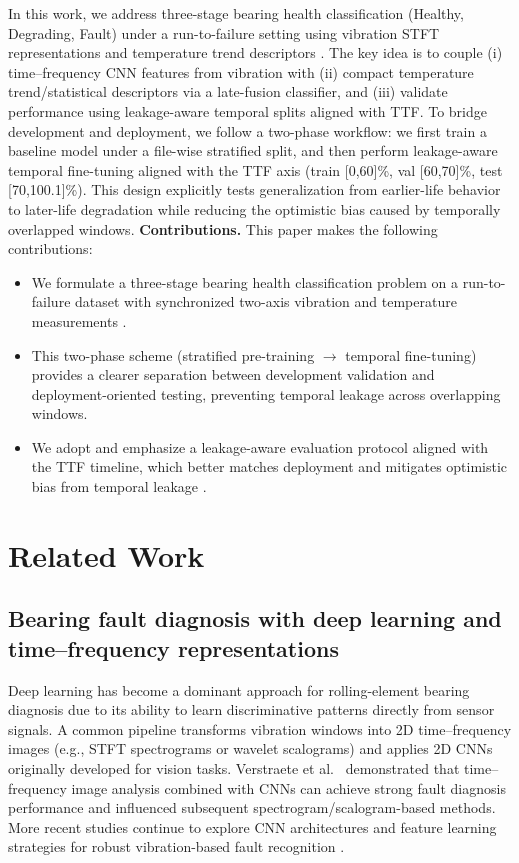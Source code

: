 \documentclass{article}
\begin{document}
In this work, we address three-stage bearing health classification (Healthy, Degrading, Fault) under a run-to-failure setting using vibration STFT representations and temperature trend descriptors \cite{jung2024dib_rtf,jung2024mendeley_rtf}. The key idea is to couple (i) time--frequency CNN features from vibration with (ii) compact temperature trend/statistical descriptors via a late-fusion classifier, and (iii) validate performance using leakage-aware temporal splits aligned with TTF.
To bridge development and deployment, we follow a two-phase workflow: we first train a baseline model under a file-wise stratified split, and then perform leakage-aware temporal fine-tuning aligned with the TTF axis (train [0,60]\%, val [60,70]\%, test [70,100.1]\%). This design explicitly tests generalization from earlier-life behavior to later-life degradation while reducing the optimistic bias caused by temporally overlapped windows.
\textbf{Contributions.} This paper makes the following contributions:
\begin{itemize}
    \item We formulate a three-stage bearing health classification problem on a run-to-failure dataset with synchronized two-axis vibration and temperature measurements \cite{jung2024dib_rtf,jung2024mendeley_rtf}.
    \item This two-phase scheme (stratified pre-training $\rightarrow$ temporal fine-tuning) provides a clearer separation between development validation and deployment-oriented testing, preventing temporal leakage across overlapping windows.
    \item We adopt and emphasize a leakage-aware evaluation protocol aligned with the TTF timeline, which better matches deployment and mitigates optimistic bias from temporal leakage \cite{wheat2024leakage,vieira2024realistic}.
\end{itemize}

\section{Related Work}
\label{sec:related_work}

\subsection{Bearing fault diagnosis with deep learning and time--frequency representations}
Deep learning has become a dominant approach for rolling-element bearing diagnosis due to its ability to learn discriminative patterns directly from sensor signals. A common pipeline transforms vibration windows into 2D time--frequency images (e.g., STFT spectrograms or wavelet scalograms) and applies 2D CNNs originally developed for vision tasks. Verstraete et al.~\cite{verstraete2017tf} demonstrated that time--frequency image analysis combined with CNNs can achieve strong fault diagnosis performance and influenced subsequent spectrogram/scalogram-based methods.
More recent studies continue to explore CNN architectures and feature learning strategies for robust vibration-based fault recognition \cite{magar2020faultnet}.
\end{document}
